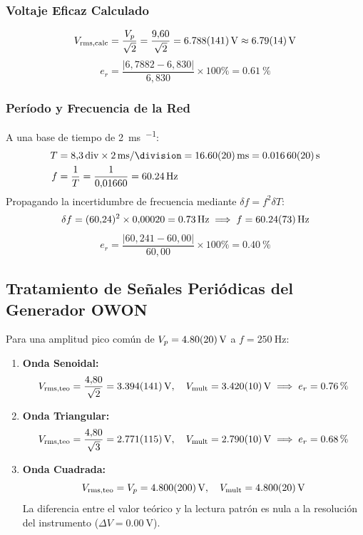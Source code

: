 \subsubsection{Voltaje Eficaz Calculado}
\begin{equation}
    V_{\text{rms,calc}} = \frac{V_p}{\sqrt{2}} = \frac{9{,}60}{\sqrt{2}} = \qty{6,788 \pm 0,141}{\volt} \approx \qty{6,79 \pm 0,14}{\volt}
\end{equation}
\[
    e_r = \frac{|6{,}7882 - 6{,}830|}{6{,}830} \times 100\% = \qty{0,61}{\percent}
\]

\subsubsection{Período y Frecuencia de la Red}
A una base de tiempo de \qty{2}{\milli\second\per\division}:
\begin{align}
    T &= 8{,}3\,\text{div} \times \qty{2}{\milli\second\per\division} = \qty{16,60 \pm 0,20}{\milli\second} = \qty{0,01660 \pm 0,00020}{\second} \\
    f &= \frac{1}{T} = \frac{1}{0{,}01660} = \qty{60,24}{\hertz}
\end{align}
Propagando la incertidumbre de frecuencia mediante $\delta f = f^2 \delta T$:
\begin{equation}
    \delta f = (60{,}24)^2 \times 0{,}00020 = \qty{0,73}{\hertz} \implies f = \qty{60,24 \pm 0,73}{\hertz}
\end{equation}
\[
    e_r = \frac{|60{,}241 - 60{,}00|}{60{,}00} \times 100\% = \qty{0,40}{\percent}
\]

\subsection{Tratamiento de Señales Periódicas del Generador OWON}
Para una amplitud pico común de $V_p = \qty{4,80 \pm 0,20}{\volt}$ a $f = \qty{250}{\hertz}$:

\begin{enumerate}
    \item \textbf{Onda Senoidal:}
    \begin{equation}
        V_{\text{rms,teo}} = \frac{4{,}80}{\sqrt{2}} = \qty{3,394 \pm 0,141}{\volt}, \quad V_{\text{mult}} = \qty{3,420 \pm 0,010}{\volt} \implies e_r = \qty{0,76}{\percent}
    \end{equation}
    \item \textbf{Onda Triangular:}
    \begin{equation}
        V_{\text{rms,teo}} = \frac{4{,}80}{\sqrt{3}} = \qty{2,771 \pm 0,115}{\volt}, \quad V_{\text{mult}} = \qty{2,790 \pm 0,010}{\volt} \implies e_r = \qty{0,68}{\percent}
    \end{equation}
    \item \textbf{Onda Cuadrada:}
    \begin{equation}
        V_{\text{rms,teo}} = V_p = \qty{4,800 \pm 0,200}{\volt}, \quad V_{\text{mult}} = \qty{4,800 \pm 0,020}{\volt}
    \end{equation}
    La diferencia entre el valor teórico y la lectura patrón es nula a la resolución del instrumento ($\Delta V = \qty{0,00}{\volt}$).
\end{enumerate}

